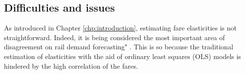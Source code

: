 

\subsection{Difficulties and issues}

As introduced in Chapter \ref{chp:introduction}, estimating fare elasticities is not straightforward.  Indeed, it is being considered the most important area of disagreement on rail demand forecasting" \citep[p.~6]{its-systra-met}. This is so because the traditional estimation of elasticities with the aid of ordinary least squares (OLS) models is hindered by the high correlation of the fares. 

